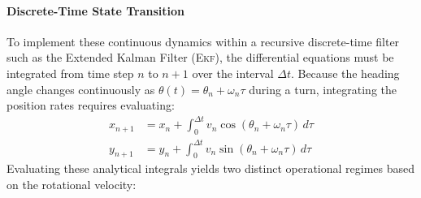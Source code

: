 \paragraph{Discrete-Time State Transition}
To implement these continuous dynamics within a recursive discrete-time filter such as the Extended Kalman Filter (\textsc{Ekf}), the differential equations must be integrated from time step $n$ to $n+1$ over the interval $\Delta t$. Because the heading angle changes continuously as $\theta(t) = \theta_n + \omega_n \tau$ during a turn, integrating the position rates requires evaluating:
\begin{align}
	x_{n+1} &= x_n + \int_0^{\Delta t} v_n \cos(\theta_n + \omega_n \tau) \, d\tau \\
	y_{n+1} &= y_n + \int_0^{\Delta t} v_n \sin(\theta_n + \omega_n \tau) \, d\tau
\end{align}
Evaluating these analytical integrals yields two distinct operational regimes based on the rotational velocity:%

